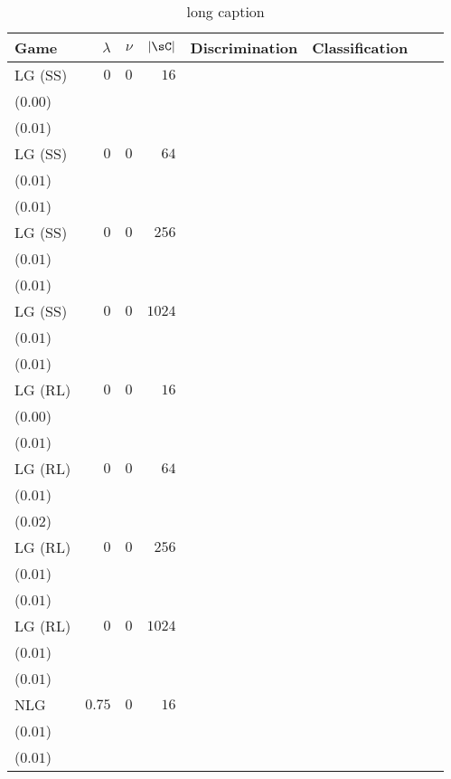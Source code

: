 \begin{table}[t]
\centering
\caption[short caption]{long caption}
\label{table:etl_imagenet_075_train}
\begin{tabular}{lrrrrrrr}
\toprule
Game & \(\lambda\) & \(\nu\) & \(|\mathcal{\sC}|\) & \multicolumn{1}{c}{Discrimination} & \multicolumn{1}{c}{Classification} \\[1ex]
\midrule
LG {\scriptsize(SS)} & \(0\) & \(0\) & \(16\) & \longcell{\(0.02\)\\{\tiny(\(0.00\))}} & \longcell{\(0.02\)\\{\tiny(\(0.01\))}} \\[2.2ex]
LG {\scriptsize(SS)} & \(0\) & \(0\) & \(64\) & \longcell{\(0.02\)\\{\tiny(\(0.01\))}} & \longcell{\(0.02\)\\{\tiny(\(0.01\))}} \\[2.2ex]
LG {\scriptsize(SS)} & \(0\) & \(0\) & \(256\) & \longcell{\(0.02\)\\{\tiny(\(0.01\))}} & \longcell{\(0.01\)\\{\tiny(\(0.01\))}} \\[2.2ex]
LG {\scriptsize(SS)} & \(0\) & \(0\) & \(1024\) & \longcell{\(0.04\)\\{\tiny(\(0.01\))}} & \longcell{\(0.03\)\\{\tiny(\(0.01\))}} \\[2.2ex]
LG {\scriptsize(RL)} & \(0\) & \(0\) & \(16\) & \longcell{\(0.03\)\\{\tiny(\(0.00\))}} & \longcell{\(0.02\)\\{\tiny(\(0.01\))}} \\[2.2ex]
LG {\scriptsize(RL)} & \(0\) & \(0\) & \(64\) & \longcell{\(0.06\)\\{\tiny(\(0.01\))}} & \longcell{\(0.03\)\\{\tiny(\(0.02\))}} \\[2.2ex]
LG {\scriptsize(RL)} & \(0\) & \(0\) & \(256\) & \longcell{\(0.08\)\\{\tiny(\(0.01\))}} & \longcell{\(0.02\)\\{\tiny(\(0.01\))}} \\[2.2ex]
LG {\scriptsize(RL)} & \(0\) & \(0\) & \(1024\) & \longcell{\(0.09\)\\{\tiny(\(0.01\))}} & \longcell{\(0.03\)\\{\tiny(\(0.01\))}} \\[2.2ex]
NLG & \(0.75\) & \(0\) & \(16\) & \longcell{\(0.04\)\\{\tiny(\(0.01\))}} & \longcell{\(0.03\)\\{\tiny(\(0.01\))}} \\[2.2ex]

\end{tabular}
\end{table}
